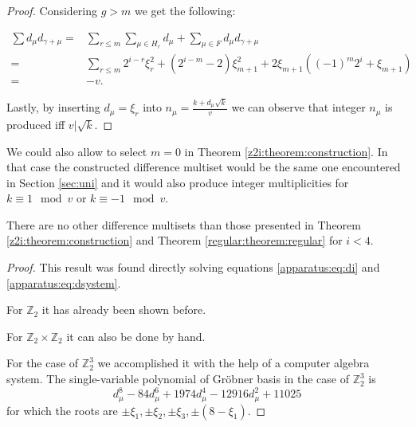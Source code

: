 \begin{proof}
    Considering $g > m$ we get the following:
    
    \begin{equation}
        \begin{split}
            \sum d_\mu d_{\gamma+\mu}
              = & \sum\limits_{r \leq m} \sum\limits_{\mu \in H_r} d_\mu
                + \sum\limits_{\mu \in F} d_\mu d_{\gamma + \mu} \\
              = & \sum\limits_{r\leq m} 2^{i-r} \xi_r^2
                + (2^{i-m}-2) \xi_{m+1}^2 + 2\xi_{m+1}((-1)^m 2^i + \xi_{m+1}) \\
              = & -v.
        \end{split}
    \end{equation}
    
    Lastly, by inserting $d_\mu = \xi_r$ into $n_\mu=\frac{k+d_\mu \sqrt k}v$ we can observe that integer $n_\mu$ is produced iff $v | \sqrt k$.
\end{proof}

\begin{remark}
    We could also allow to select $m=0$ in Theorem \ref{z2i:theorem:construction}. In that case the constructed difference multiset would be the same one encountered in Section \ref{sec:uni} and it would also produce  integer multiplicities for $k \equiv 1 \mod v$ or $k \equiv -1 \mod v$.
\end{remark}

\begin{theorem}
    There are no other difference multisets than those presented in Theorem \ref{z2i:theorem:construction} and Theorem \ref{regular:theorem:regular} for $i < 4$.
\end{theorem}

\begin{proof}
    This result was found directly solving equations \eqref{apparatus:eq:di} and \eqref{apparatus:eq:dsystem}.
    
    For $\mathbb Z_2$ it has already been shown before\cite{buratti1999old}.
    
    For $\mathbb Z_2 \times \mathbb Z_2$ it can also be done by hand.
    
    For the case of $\mathbb Z_2^3$ we accomplished it with the help of a computer algebra system. The single-variable polynomial of Gröbner basis in the case of $\mathbb Z_2^3$ is
    \begin{equation}
        d_\mu^8 - 84 d_\mu^6 + 1974 d_\mu^4 - 12916 d_\mu^2 + 11025
    \end{equation}
    for which the roots are $\pm\xi_1, \pm\xi_2, \pm\xi_3, \pm(8-\xi_1)$.
\end{proof}


